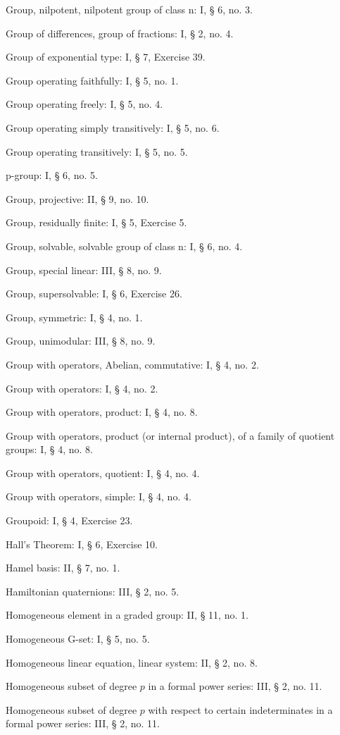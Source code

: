 Group, nilpotent, nilpotent group of class n: I, § 6, no. 3.

Group of differences, group of fractions: I, § 2, no. 4.

Group of exponential type: I, § 7, Exercise 39.

Group operating faithfully: I, § 5, no. 1.

Group operating freely: I, § 5, no. 4.

Group operating simply transitively: I, § 5, no. 6.

Group operating transitively: I, § 5, no. 5.

p-group: I, § 6, no. 5.

Group, projective: II, § 9, no. 10.

Group, residually finite: I, § 5, Exercise 5.

Group, solvable, solvable group of class n: I, § 6, no. 4.

Group, special linear: III, § 8, no. 9.

Group, supersolvable: I, § 6, Exercise 26.

Group, symmetric: I, § 4, no. 1.

Group, unimodular: III, § 8, no. 9.

Group with operators, Abelian, commutative: I, § 4, no. 2.

Group with operators: I, § 4, no. 2.

Group with operators, product: I, § 4, no. 8.

Group with operators, product (or internal product), of a family of quotient groups: I, § 4, no. 8.

Group with operators, quotient: I, § 4, no. 4.

Group with operators, simple: I, § 4, no. 4.

Groupoid: I, § 4, Exercise 23.

Hall's Theorem: I, § 6, Exercise 10.

Hamel basis: II, § 7, no. 1.

Hamiltonian quaternions: III, § 2, no. 5.

Homogeneous element in a graded group: II, § 11, no. 1.

Homogeneous G-set: I, § 5, no. 5.

Homogeneous linear equation, linear system: II, § 2, no. 8.

Homogeneous subset of degree \(p\) in a formal power series: III, § 2, no. 11.

Homogeneous subset of degree \(p\) with respect to certain indeterminates in a formal power series: III, § 2, no. 11.

